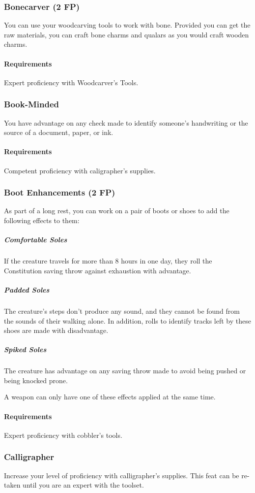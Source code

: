 \subsubsection{Bonecarver (2 FP)} \label{feat::bonecarver}
    You can use your woodcarving tools to work with bone.
    Provided you can get the raw materials, you can craft bone charms and qualars as you would craft wooden charms.
    \paragraph{Requirements} Expert proficiency with Woodcarver's Tools.
\subsubsection{Book-Minded} \label{feat::bookminded}
    You have advantage on any check made to identify someone's handwriting or the source of a document, paper, or ink.
    \paragraph{Requirements} Competent proficiency with caligrapher's supplies.
\subsubsection{Boot Enhancements (2 FP)} \label{feat::bootenhancements}
    As part of a long rest, you can work on a pair of boots or shoes to add the following effects to them:
    \subparagraph{Comfortable Soles} If the creature travels for more than 8 hours in one day, they roll the Constitution saving throw against exhaustion with advantage.
    \subparagraph{Padded Soles} The creature's steps don't produce any sound, and they cannot be found from the sounds of their walking alone.
    In addition, rolls to identify tracks left by these shoes are made with disadvantage.
    \subparagraph{Spiked Soles} The creature has advantage on any saving throw made to avoid being pushed or being knocked prone.

    A weapon can only have one of these effects applied at the same time.
    \paragraph{Requirements} Expert proficiency with cobbler's tools.
\subsubsection{Calligrapher} \label{feat::calligrapher}
    Increase your level of proficiency with calligrapher's supplies.
    This feat can be re-taken until you are an expert with the toolset.

